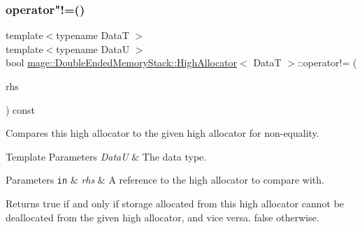 \subsubsection{\texorpdfstring{operator"!=()}{operator!=()}}
{\footnotesize\ttfamily template$<$typename DataT $>$ \\
template$<$typename DataU $>$ \\
bool \hyperlink{classmage_1_1_double_ended_memory_stack_1_1_high_allocator}{mage\+::\+Double\+Ended\+Memory\+Stack\+::\+High\+Allocator}$<$ DataT $>$\+::operator!= (\begin{DoxyParamCaption}\item[{const \hyperlink{classmage_1_1_double_ended_memory_stack_1_1_high_allocator}{High\+Allocator}$<$ DataU $>$ \&}]{rhs }\end{DoxyParamCaption}) const\hspace{0.3cm}{\ttfamily [noexcept]}}

Compares this high allocator to the given high allocator for non-\/equality.


\begin{DoxyTemplParams}{Template Parameters}
{\em DataU} & The data type. \\
\hline
\end{DoxyTemplParams}

\begin{DoxyParams}[1]{Parameters}
\mbox{\tt in}  & {\em rhs} & A reference to the high allocator to compare with. \\
\hline
\end{DoxyParams}
\begin{DoxyReturn}{Returns}
{\ttfamily true} if and only if storage allocated from this high allocator cannot be deallocated from the given high allocator, and vice versa. {\ttfamily false} otherwise. 
\end{DoxyReturn}
\hypertarget{classmage_1_1_double_ended_memory_stack_1_1_high_allocator_ab9d94cbf9334b14208006202746e9077}{}\label{classmage_1_1_double_ended_memory_stack_1_1_high_allocator_ab9d94cbf9334b14208006202746e9077} 
